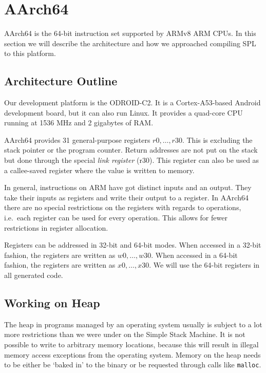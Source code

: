 \chapter{AArch64}

AArch64 is the 64-bit instruction set supported by ARMv8 ARM CPUs.
In this section we will describe the architecture and how we approached compiling SPL to this platform.

\section{Architecture Outline}

Our development platform is the ODROID-C2.
It is a Cortex-A53-based Android development board, but it can also run Linux.
It provides a quad-core CPU running at 1536 MHz and 2 gigabytes of RAM\@.

AArch64 provides 31 general-purpose registers $r0, \ldots, r30$.
This is excluding the stack pointer or the program counter.
Return addresses are not put on the stack but done through the special \emph{link register} (r30).
This register can also be used as a callee-saved register where the value is written to memory.

In general, instructions on ARM have got distinct inputs and an output.
They take their inputs as registers and write their output to a register.
In AArch64 there are no special restrictions on the registers with regards to operations, i.e.\ each register can be used for every operation.
This allows for fewer restrictions in register allocation.

Registers can be addressed in 32-bit and 64-bit modes.
When accessed in a 32-bit fashion, the registers are written as $w0, \ldots, w30$.
When accessed in a 64-bit fashion, the registers are written as $x0, \ldots, x30$.
We will use the 64-bit registers in all generated code.

\section{Working on Heap}

The heap in programs managed by an operating system usually is subject to a lot more restrictions than we were under on the Simple Stack Machine.
It is not possible to write to arbitrary memory locations, because this will result in illegal memory access exceptions from the operating system.
Memory on the heap needs to be either be `baked in' to the binary or be requested through calls like \texttt{malloc}.

